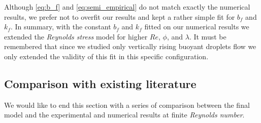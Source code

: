 

Although \ref{eq:b_f} and \ref{eq:semi_empirical} do not match exactly the numerical results, we prefer not to overfit our results and kept a rather simple fit for $b_f$ and $k_f$. 
In summary, with the constant $b_f$ and $k_f$ fitted on our numerical results we extended the \textit{Reynolds stress} model for higher $Re$, $\phi$, and $\lambda$. 
It must be remembered that since we studied only vertically rising buoyant droplets flow we only extended the validity of this fit in this specific configuration. 



\subsection{Comparison with existing literature}

We would like to end this section with a series of comparison between the final model and the experimental and numerical results at finite \textit{Reynolds number}. 

